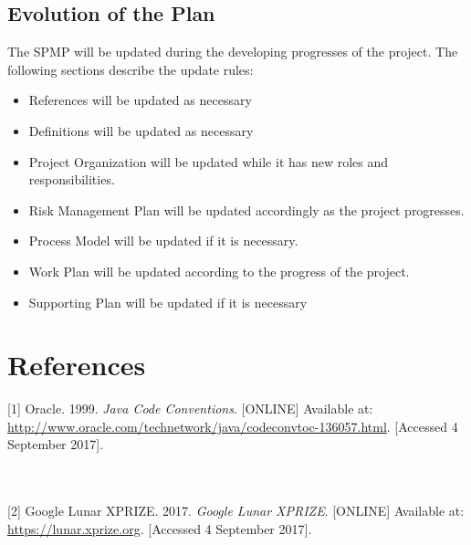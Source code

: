 \documentclass[12pt,a4paper]{article}
\begin{document}
    \newpage

	\subsection{Evolution of the Plan}
    The SPMP will be updated during the developing progresses of the project.
    The following sections describe the update rules:
    
    \begin{itemize}
    \item References will be updated as necessary
    \end{itemize}
    \begin{itemize}
    \item Definitions will be updated as necessary
    \end{itemize}
    \begin{itemize}
    \item Project Organization will be updated while it has new roles and responsibilities.
    \end{itemize}
    \begin{itemize}
    \item Risk Management Plan will be updated accordingly as the project progresses.
    \end{itemize}
    \begin{itemize}
    \item Process Model will be updated if it is necessary.
    \end{itemize}
    \begin{itemize}
    \item Work Plan will be updated according to the progress of the project.
    \end{itemize}
    \begin{itemize}
    \item Supporting Plan will be updated if it is necessary
    \end{itemize}

    
    \section{References}
    \hypertarget{javacodeconvent}{[1] Oracle. 1999. \emph{Java Code Conventions}. [ONLINE] Available at: \url{http://www.oracle.com/technetwork/java/codeconvtoc-136057.html}. [Accessed 4 September 2017].}\\ \\
    \hypertarget{googlelunarxprize}{[2] Google Lunar XPRIZE. 2017. \emph{Google Lunar XPRIZE}. [ONLINE] Available at: \url{https://lunar.xprize.org}. [Accessed 4 September 2017].}\\ \\
\end{document}
